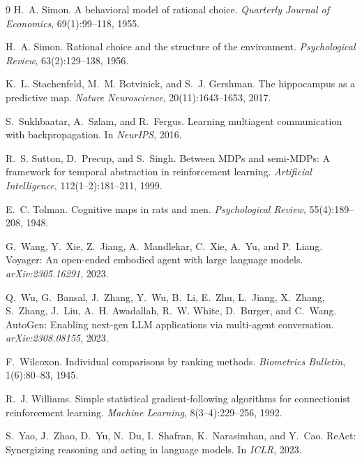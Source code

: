 \documentclass{article}
\begin{document}
{\begin{thebibliography}{9}
H.~A. Simon.
\newblock A behavioral model of rational choice.
\newblock \emph{Quarterly Journal of Economics}, 69(1):99--118, 1955.

H.~A. Simon.
\newblock Rational choice and the structure of the environment.
\newblock \emph{Psychological Review}, 63(2):129--138, 1956.

K.~L. Stachenfeld, M.~M. Botvinick, and S.~J. Gershman.
\newblock The hippocampus as a predictive map.
\newblock \emph{Nature Neuroscience}, 20(11):1643--1653, 2017.

S.~Sukhbaatar, A.~Szlam, and R.~Fergus.
\newblock Learning multiagent communication with backpropagation.
\newblock In \emph{NeurIPS}, 2016.

R.~S. Sutton, D.~Precup, and S.~Singh.
\newblock Between MDPs and semi-MDPs: A framework for temporal abstraction in reinforcement learning.
\newblock \emph{Artificial Intelligence}, 112(1--2):181--211, 1999.

E.~C. Tolman.
\newblock Cognitive maps in rats and men.
\newblock \emph{Psychological Review}, 55(4):189--208, 1948.

G.~Wang, Y.~Xie, Z.~Jiang, A.~Mandlekar, C.~Xie, A.~Yu, and P.~Liang.
\newblock Voyager: An open-ended embodied agent with large language models.
\newblock \emph{arXiv:2305.16291}, 2023.

Q.~Wu, G.~Bansal, J.~Zhang, Y.~Wu, B.~Li, E.~Zhu, L.~Jiang, X.~Zhang, S.~Zhang, J.~Liu, A.~H. Awadallah, R.~W. White, D.~Burger, and C.~Wang.
\newblock AutoGen: Enabling next-gen LLM applications via multi-agent conversation.
\newblock \emph{arXiv:2308.08155}, 2023.

F.~Wilcoxon.
\newblock Individual comparisons by ranking methods.
\newblock \emph{Biometrics Bulletin}, 1(6):80--83, 1945.

R.~J. Williams.
\newblock Simple statistical gradient-following algorithms for connectionist reinforcement learning.
\newblock \emph{Machine Learning}, 8(3--4):229--256, 1992.

S.~Yao, J.~Zhao, D.~Yu, N.~Du, I.~Shafran, K.~Narasimhan, and Y.~Cao.
\newblock ReAct: Synergizing reasoning and acting in language models.
\newblock In \emph{ICLR}, 2023.


\end{thebibliography}}
\end{document}
